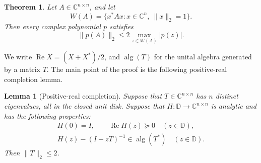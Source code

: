 \documentclass[11pt]{article}
\newtheorem{theorem}{Theorem}
\newtheorem{lemma}{Lemma}
\newcommand{\D}{\mathbb D}
\newcommand{\C}{\mathbb C}
\newcommand{\alg}{\operatorname{alg}}
\newcommand{\RePart}{\operatorname{Re}}
\begin{document}
\begin{theorem}
Let \(A\in\C^{n\times n}\), and let
\[
 W(A)=\{x^*Ax:x\in\C^n,\ \|x\|_2=1\}.
\]
Then every complex polynomial \(p\) satisfies
\[
 \|p(A)\|_2\leq 2\max_{z\in W(A)}|p(z)|.
\]
\end{theorem}

We write \(\RePart X=(X+X^*)/2\), and \(\alg(T)\) for the unital
algebra generated by a matrix \(T\).  The main point of the proof is the
following positive-real completion lemma.

\begin{lemma}[Positive-real completion]
\label{lem:completion}
Suppose that \(T\in\C^{n\times n}\) has \(n\) distinct eigenvalues, all in
the closed unit disk.  Suppose that \(H:\D\to\C^{n\times n}\) is analytic
and has the following properties:
\[
 \begin{gathered}
 H(0)=I,\qquad \RePart H(z)\succeq0\quad(z\in\D),\\
 H(z)-(I-zT)^{-1}\in\alg(T^*)\quad(z\in\D).
 \end{gathered}
\]
Then \(\|T\|_2\leq2\).
\end{lemma}
\end{document}
